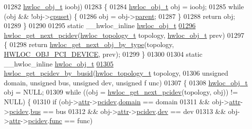 \begin{DoxyCode}
01282                               \hyperlink{a00016}{hwloc_obj_t} ioobj)
01283 \{
01284   \hyperlink{a00016}{hwloc_obj_t} obj = ioobj;
01285   \textcolor{keywordflow}{while} (obj && !obj->\hyperlink{a00016_a67925e0f2c47f50408fbdb9bddd0790f}{cpuset}) \{
01286     obj = obj->\hyperlink{a00016_adc494f6aed939992be1c55cca5822900}{parent};
01287   \}
01288   \textcolor{keywordflow}{return} obj;
01289 \}
01290 
01295 \textcolor{keyword}{static} \_\_hwloc\_inline \hyperlink{a00016}{hwloc_obj_t}
\hypertarget{a00031_source_l01296}{}\hyperlink{a00064_gad6e1ed122ef3b6e098538d75acd5e3f6}{01296} \hyperlink{a00064_gad6e1ed122ef3b6e098538d75acd5e3f6}{hwloc_get_next_pcidev}(\hyperlink{a00039_ga9d1e76ee15a7dee158b786c30b6a6e38}{hwloc_topology_t} topology, \hyperlink{a00016}{hwloc_obj_t} prev)
01297 \{
01298   \textcolor{keywordflow}{return} \hyperlink{a00053_ga5f08ceb69375341e73563cfe2e77534e}{hwloc_get_next_obj_by_type}(topology, \hyperlink{a00041_ggacd37bb612667dc437d66bfb175a8dc55a5d8117a54df1fbd3606ab19e42cb0ea9}{HWLOC_OBJ_PCI_DEVICE}, prev);
01299 \}
01300 
01304 \textcolor{keyword}{static} \_\_hwloc\_inline \hyperlink{a00016}{hwloc_obj_t}
\hypertarget{a00031_source_l01305}{}\hyperlink{a00064_ga546e1d690c63fb24177f3013ed78ceb1}{01305} \hyperlink{a00064_ga546e1d690c63fb24177f3013ed78ceb1}{hwloc_get_pcidev_by_busid}(\hyperlink{a00039_ga9d1e76ee15a7dee158b786c30b6a6e38}{hwloc_topology_t} topology,
01306                           \textcolor{keywordtype}{unsigned} domain, \textcolor{keywordtype}{unsigned} bus, \textcolor{keywordtype}{unsigned} dev, \textcolor{keywordtype}{unsigned} f
      unc)
01307 \{
01308   \hyperlink{a00016}{hwloc_obj_t} obj = NULL;
01309   \textcolor{keywordflow}{while} ((obj = \hyperlink{a00064_gad6e1ed122ef3b6e098538d75acd5e3f6}{hwloc_get_next_pcidev}(topology, obj)) != NULL) \{
01310     \textcolor{keywordflow}{if} (obj->\hyperlink{a00016_accd40e29f71f19e88db62ea3df02adc8}{attr}->\hyperlink{a00017_a4203d713ce0f5beaa6ee0e9bdac70828}{pcidev}.\hyperlink{a00022_a8fba44988deb98613c1505a4019a34dc}{domain} == domain
01311         && obj->\hyperlink{a00016_accd40e29f71f19e88db62ea3df02adc8}{attr}->\hyperlink{a00017_a4203d713ce0f5beaa6ee0e9bdac70828}{pcidev}.\hyperlink{a00022_aae99e035e8d1387d7b8768aaa8eceb0a}{bus} == bus
01312         && obj->\hyperlink{a00016_accd40e29f71f19e88db62ea3df02adc8}{attr}->\hyperlink{a00017_a4203d713ce0f5beaa6ee0e9bdac70828}{pcidev}.\hyperlink{a00022_a3d70c84a12f7e93d14c8d47bf4fd9dc5}{dev} == dev
01313         && obj->\hyperlink{a00016_accd40e29f71f19e88db62ea3df02adc8}{attr}->\hyperlink{a00017_a4203d713ce0f5beaa6ee0e9bdac70828}{pcidev}.\hyperlink{a00022_a695f32df53f4ef728670bfcf31b74e0f}{func} == func)

\end{DoxyCode}
